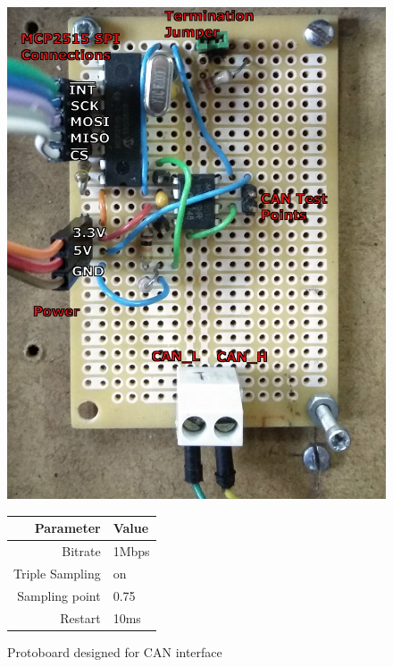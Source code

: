 \begin{figure}[!h]
	\begin{minipage}{0.49\linewidth}
		\centering
		\includegraphics[width=1\linewidth]{figures/proto_can}
		\caption{Protoboard designed for CAN interface}
		\label{fig:proto_can}
	\end{minipage}
	\begin{minipage}{0.49\linewidth}
		\centering
		\begin{tabular}{rl}
			\toprule
			\textbf{Parameter} & \textbf{Value}\\
			\midrule
			Bitrate & 1Mbps\\
			Triple Sampling & on\\
			Sampling point & 0.75\\
			Restart & 10ms\\
			\bottomrule
		\end{tabular}
	    \label{tab:can_settings}
	\end{minipage}
\end{figure}

